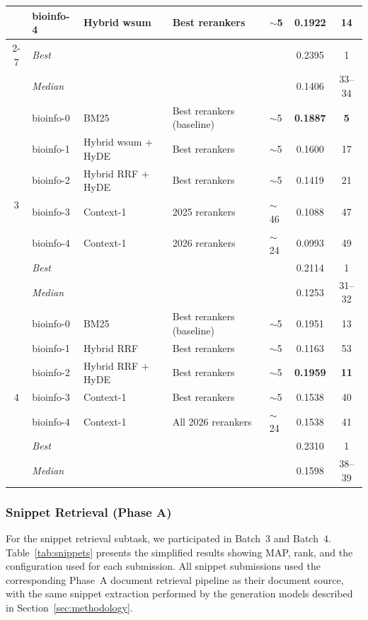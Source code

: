 \begin{table}[ht]
\begin{tabular}{cl|lll|cc}
    & bioinfo-4 & Hybrid wsum & Best rerankers & $\sim$5 & \textbf{0.1922} & \textbf{14} \\
    \cmidrule(l){2-7}
    & \textit{Best} & \multicolumn{3}{l|}{} & 0.2395 & 1 \\
    & \textit{Median} & \multicolumn{3}{l|}{} & 0.1406 & 33--34 \\
    \midrule
    \multirow{7}{*}{3}
    & bioinfo-0 & BM25 & Best rerankers (baseline) & $\sim$5 & \textbf{0.1887} & \textbf{5} \\
    & bioinfo-1 & Hybrid wsum + HyDE & Best rerankers & $\sim$5 & 0.1600 & 17 \\
    & bioinfo-2 & Hybrid RRF + HyDE & Best rerankers & $\sim$5 & 0.1419 & 21 \\
    & bioinfo-3 & Context-1 & 2025 rerankers & $\sim$46 & 0.1088 & 47 \\
    & bioinfo-4 & Context-1 & 2026 rerankers & $\sim$24 & 0.0993 & 49 \\
    \cmidrule(l){2-7}
    & \textit{Best} & \multicolumn{3}{l|}{} & 0.2114 & 1 \\
    & \textit{Median} & \multicolumn{3}{l|}{} & 0.1253 & 31--32 \\
    \midrule
    \multirow{7}{*}{4}
    & bioinfo-0 & BM25 & Best rerankers (baseline) & $\sim$5 & 0.1951 & 13 \\
    & bioinfo-1 & Hybrid RRF & Best rerankers & $\sim$5 & 0.1163 & 53 \\
    & bioinfo-2 & Hybrid RRF + HyDE & Best rerankers & $\sim$5 & \textbf{0.1959} & \textbf{11} \\
    & bioinfo-3 & Context-1 & Best rerankers & $\sim$5 & 0.1538 & 40 \\
    & bioinfo-4 & Context-1 & All 2026 rerankers & $\sim$24 & 0.1538 & 41 \\
    \cmidrule(l){2-7}
    & \textit{Best} & \multicolumn{3}{l|}{} & 0.2310 & 1 \\
    & \textit{Median} & \multicolumn{3}{l|}{} & 0.1598 & 38--39 \\
    \bottomrule
  \end{tabular}
\end{table}

\subsubsection{Snippet Retrieval (Phase A)}
\label{sec:results-snippets}

For the snippet retrieval subtask, we participated in Batch~3 and Batch~4. Table~\ref{tab:snippets} presents the simplified results showing MAP, rank, and the configuration used for each submission. All snippet submissions used the corresponding Phase~A document retrieval pipeline as their document source, with the same snippet extraction performed by the generation models described in Section~\ref{sec:methodology}.

